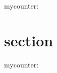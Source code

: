 \documentclass{article}
\newcounter{mycounter}[section]
\begin{document}
mycounter: 

\section{section}

mycounter: 
\end{document}
